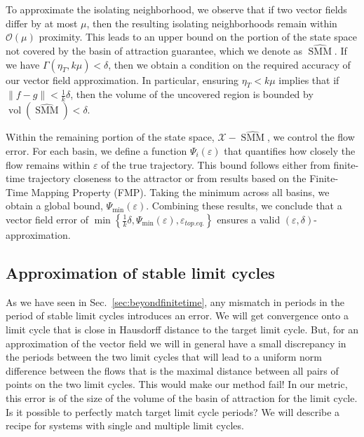 \documentclass{article}
\theoremstyle{definition} \newtheorem{definition}{Definition}
\theoremstyle{remark} \newtheorem{remark}{Remark}
\newcommand{\vol}{\operatorname{vol}}
\newcounter{ct}
\begin{document}
 To approximate the isolating neighborhood, we observe that if two vector fields differ by at most $\mu$, then the resulting isolating neighborhoods remain within $\mathcal{O}(\mu)$ proximity. This leads to an upper bound on the portion of the state space not covered by the basin of attraction guarantee, which we denote as $\widehat{\operatorname{SMM}}$.
  If we have $\Gamma(\eta_T, k\mu) < \delta$, then we obtain a condition on the required accuracy of our vector field approximation.
 In particular, ensuring $\eta_T < k\mu$ implies that if $\| f - g \| < \tfrac{1}{k} \delta$, then the volume of the uncovered region is bounded by $\vol(\widehat{\operatorname{SMM}}) < \delta$.  

Within the remaining portion of the state space, $\mathcal{X} - \widehat{\operatorname{SMM}}$, we control the flow error.
 For each basin, we define a function $\Psi_i(\varepsilon)$ that quantifies how closely the flow remains within $\varepsilon$ of the true trajectory.
  This bound follows either from finite-time trajectory closeness to the attractor or from results based on the Finite-Time Mapping Property (FMP). Taking the minimum across all basins, we obtain a global bound, $\Psi_{\min}(\varepsilon)$.  
Combining these results, we conclude that  a vector field error of $\min \left\{ \frac{1}{k} \delta, \Psi_{\min}(\varepsilon), \varepsilon_{top.eq.} \right\} $
ensures a valid $(\varepsilon, \delta)$-approximation.





\subsection{Approximation of stable limit cycles}\label{sec:lc_theorem}
As we have seen in Sec.~\ref{sec:beyondfinitetime}, any mismatch in periods in the period of stable limit cycles introduces an error.
We will get convergence onto a limit cycle that is close in Hausdorff distance to the target limit cycle. %
But, for an approximation of the vector field we will in general have a small discrepancy in the periods between the two limit cycles that will lead to a uniform norm difference between the flows that is the maximal distance between all pairs of points on the two limit cycles.
This would make our method fail!
In our metric, this error is of the size of the volume of the basin of attraction for the limit cycle.
Is it possible to perfectly match target limit cycle periods?
We will describe a recipe for systems with single and multiple limit cycles.
\end{document}
